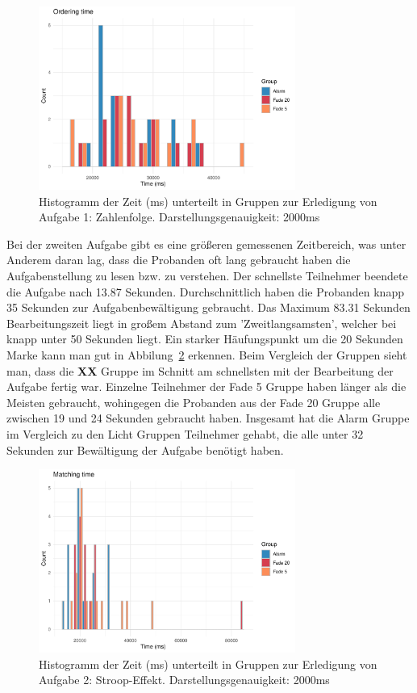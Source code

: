\begin{figure}[H]
	\centering
	\includegraphics[width=0.75\textwidth]{./_StudyResults/orderingTimeHist}
	\caption{Histogramm der Zeit (ms) unterteilt in Gruppen zur Erledigung von Aufgabe 1: Zahlenfolge. Darstellungsgenauigkeit: 2000ms}
	\label{fig:orderingTimeHistogram}
\end{figure}


Bei der zweiten Aufgabe gibt es eine größeren gemessenen Zeitbereich, was unter Anderem daran lag, dass die Probanden oft lang gebraucht haben die Aufgabenstellung zu lesen bzw. zu verstehen. Der schnellste Teilnehmer beendete die Aufgabe nach 13.87 Sekunden. Durchschnittlich haben die Probanden knapp 35 Sekunden zur Aufgabenbewältigung gebraucht. Das Maximum 83.31 Sekunden Bearbeitungszeit liegt in großem Abstand zum 'Zweitlangsamsten', welcher bei knapp unter 50 Sekunden liegt. Ein starker Häufungspunkt um die 20 Sekunden Marke kann man gut in Abbilung~\ref{fig:matchingTimeHistogram} erkennen. 
Beim Vergleich der Gruppen sieht man, dass die \textbf{XX} Gruppe im Schnitt am schnellsten mit der Bearbeitung der Aufgabe fertig war. Einzelne Teilnehmer der Fade 5 Gruppe haben länger als die Meisten gebraucht, wohingegen die Probanden aus der Fade 20 Gruppe alle zwischen 19 und 24 Sekunden gebraucht haben. Insgesamt hat die Alarm Gruppe im Vergleich zu den Licht Gruppen Teilnehmer gehabt, die alle unter 32 Sekunden zur Bewältigung der Aufgabe benötigt haben.

\begin{figure}[H]
	\centering
	\includegraphics[width=0.75\textwidth]{./_StudyResults/matchingTimeHist}
	\caption{Histogramm der Zeit (ms) unterteilt in Gruppen zur Erledigung von Aufgabe 2: Stroop-Effekt. Darstellungsgenauigkeit: 2000ms}
	\label{fig:matchingTimeHistogram}
\end{figure}

